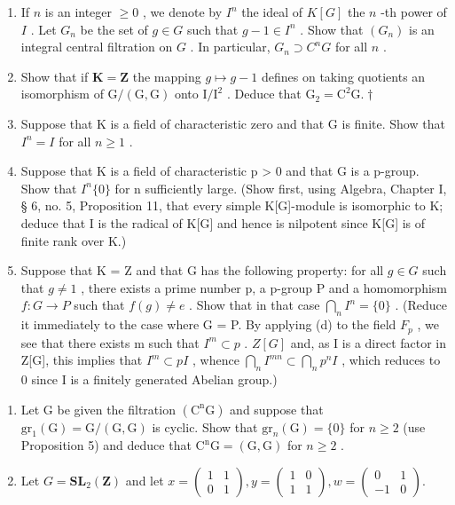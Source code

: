 \begin{enumerate}
\def\labelenumi{(\alph{enumi})}
\item
  If \(n\) is an integer \(\geqslant 0\) , we denote by \(I^n\) the ideal of \(K[G]\) the \(n\) -th power of \(I\) . Let \(G_n\) be the set of \(g \in G\) such that \(g - 1 \in I^n\) . Show that \((G_n)\) is an integral central filtration on \(G\) . In particular, \(G_n \supset C^n G\) for all \(n\) .
\item
  Show that if \(\mathbf{K} = \mathbf{Z}\) the mapping \(g \mapsto g - 1\) defines on taking quotients an isomorphism of \(\mathrm{G} / (\mathrm{G}, \mathrm{G})\) onto \(\mathrm{I} / \mathrm{I}^2\) . Deduce that \(\mathrm{G}_2 = \mathrm{C}^2\mathrm{G}.\dagger\)
\item
  Suppose that K is a field of characteristic zero and that G is finite. Show that \(I^{n} = I\) for all \(n \geqslant 1\) .
\item
  Suppose that K is a field of characteristic p \textgreater{} 0 and that G is a p-group. Show that \(I^{n}\{0\}\) for n sufficiently large. (Show first, using Algebra, Chapter I, § 6, no. 5, Proposition 11, that every simple K{[}G{]}-module is isomorphic to K; deduce that I is the radical of K{[}G{]} and hence is nilpotent since K{[}G{]} is of finite rank over K.)
\item
  Suppose that K = Z and that G has the following property: for all \(g \in G\) such that \(g \neq 1\) , there exists a prime number p, a p-group P and a homomorphism \(f: G \to P\) such that \(f(g) \neq e\) . Show that in that case \(\bigcap_{n} I^{n} = \{0\}\) . (Reduce it immediately to the case where G = P. By applying (d) to the field \(F_{p}\) , we see that there exists m such that \(I^{m} \subset p\) . \(Z[G]\) and, as I is a direct factor in Z{[}G{]}, this implies that \(I^{m} \subset pI\) , whence \(\bigcap_{n} I^{mn} \subset \bigcap_{n} p^{n}I\) , which reduces to 0 since I is a finitely generated Abelian group.)
\end{enumerate}

\begin{enumerate}
\def\labelenumi{\arabic{enumi}.}
\setcounter{enumi}{6}
\item
  Let G be given the filtration \((\mathrm{C}^{\mathrm{n}}\mathrm{G})\) and suppose that \(\mathrm{gr}_{1}(\mathrm{G}) = \mathrm{G}/(\mathrm{G}, \mathrm{G})\) is cyclic. Show that \(\mathrm{gr}_{n}(\mathrm{G}) = \{0\}\) for \(n \geqslant 2\) (use Proposition 5) and deduce that \(\mathrm{C}^{\mathrm{n}}\mathrm{G} = (\mathrm{G}, \mathrm{G})\) for \(n \geqslant 2\) .
\item
  Let \(G = \mathbf{S}\mathbf{L}_{2}(\mathbf{Z})\) and let \(x = \begin{pmatrix} 1 & 1 \\ 0 & 1 \end{pmatrix}, y = \begin{pmatrix} 1 & 0 \\ 1 & 1 \end{pmatrix}, w = \begin{pmatrix} 0 & 1 \\ -1 & 0 \end{pmatrix}.\)
\end{enumerate}

